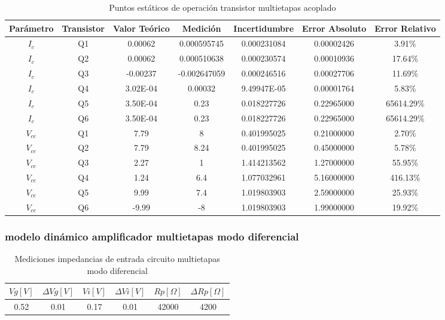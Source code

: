\begin{table}[h!]
\centering
\begin{tabular}{|c|c|c|c|c|c|c|}
\hline
\textbf{Parámetro} & \textbf{Transistor} & \textbf{Valor Teórico} & \textbf{Medición} & \textbf{Incertidumbre} & \textbf{Error Absoluto} & \textbf{Error Relativo} \\ \hline
$I_{c}$ & Q1 & 0.00062 & 0.000595745 & 0.000231084 & 0.00002426 & 3.91\% \\ \hline
$I_{c}$ & Q2 & 0.00062 & 0.000510638 & 0.000230574 & 0.00010936 & 17.64\% \\ \hline
$I_{c}$ & Q3 & -0.00237 & -0.002647059 & 0.000246516 & 0.00027706 & 11.69\% \\ \hline
$I_{c}$ & Q4 & 3.02E-04 & 0.00032 & 9.49947E-05 & 0.00001764 & 5.83\% \\ \hline
$I_{c}$ & Q5 & 3.50E-04 & 0.23 & 0.018227726 & 0.22965000 & 65614.29\% \\ \hline
$I_{c}$ & Q6 & 3.50E-04 & 0.23 & 0.018227726 & 0.22965000 & 65614.29\% \\ \hline
$V_{ce}$ & Q1 & 7.79 & 8 & 0.401995025 & 0.21000000 & 2.70\% \\ \hline
$V_{ce}$ & Q2 & 7.79 & 8.24 & 0.401995025 & 0.45000000 & 5.78\% \\ \hline
$V_{ce}$ & Q3 & 2.27 & 1 & 1.414213562 & 1.27000000 & 55.95\% \\ \hline
$V_{ce}$ & Q4 & 1.24 & 6.4 & 1.077032961 & 5.16000000 & 416.13\% \\ \hline
$V_{ce}$ & Q5 & 9.99 & 7.4 & 1.019803903 & 2.59000000 & 25.93\% \\ \hline
$V_{ce}$ & Q6 & -9.99 & -8 & 1.019803903 & 1.99000000 & 19.92\% \\ \hline
\end{tabular}
\caption{Puntos estáticos de operación transistor multietapas acoplado}
\label{tab:med-puntos-estaticos-operacion-transistor-multietapas-acoplado}
\end{table}

\FloatBarrier
\subsubsection{modelo dinámico amplificador multietapas modo diferencial}

\begin{table}[h!]
\centering
\begin{tabular}{|c|c|c|c|c|c|}
\hline
\textbf{\(Vg[V]\)} & \textbf{\(\varDelta Vg[V]\)} & \textbf{\(Vi[V]\)} & \textbf{\(\varDelta Vi[V]\)} & \textbf{\(Rp[\Omega]\)} & \textbf{\(\varDelta Rp[\Omega]\)} \\ \hline
0.52 & 0.01 & 0.17 & 0.01 & 42000 & 4200 \\ \hline
\end{tabular}
\caption{Mediciones impedancias de entrada circuito multietapas modo diferencial}
\label{tab:med-impedancias-entrada-circuito-multietapas-modo-diferencial}
\end{table}

